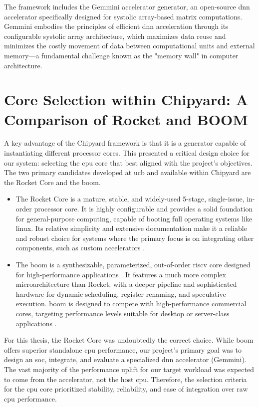 The framework includes the Gemmini accelerator generator, an open-source \acrshort{dnn} accelerator specifically designed for systolic array-based matrix computations. Gemmini embodies the principles of efficient \acrshort{dnn} acceleration through its configurable systolic array architecture, which maximizes data reuse and minimizes the costly movement of data between computational units and external memory—a fundamental challenge known as the "memory wall" in computer architecture.

\section{Core Selection within Chipyard: A Comparison of Rocket and BOOM}

A key advantage of the Chipyard framework is that it is a generator capable of instantiating different processor cores. This presented a critical design choice for our system: selecting the \acrshort{cpu} core that best aligned with the project's objectives. The two primary candidates developed at \acrshort{ucb} and available within Chipyard are the Rocket Core and the \acrfull{boom}.

\begin{itemize}
    \item The Rocket Core is a mature, stable, and widely-used 5-stage, single-issue, in-order processor core. It is highly configurable and provides a solid foundation for general-purpose computing, capable of booting full operating systems like \acrshort{linux}. Its relative simplicity and extensive documentation make it a reliable and robust choice for systems where the primary focus is on integrating other components, such as custom accelerators \cite{asanovic2016rocketchip}.
    \item The \acrfull{boom} is a synthesizable, parameterized, out-of-order \acrshort{riscv} core designed for high-performance applications \cite{celio2016boom_spec, celio_phdthesis_2018boom}. It features a much more complex microarchitecture than Rocket, with a deeper pipeline and sophisticated hardware for dynamic scheduling, register renaming, and speculative execution. \acrshort{boom} is designed to compete with high-performance commercial cores, targeting performance levels suitable for desktop or server-class applications \cite{zhao2020sonicboom_ieee}.
\end{itemize}

For this thesis, the Rocket Core was undoubtedly the correct choice. While \acrshort{boom} offers superior standalone \acrshort{cpu} performance, our project's primary goal was to design an \acrshort{soc}, integrate, and evaluate a specialized \acrshort{dnn} accelerator (Gemmini). The vast majority of the performance uplift for our target workload was expected to come from the accelerator, not the host \acrshort{cpu}. Therefore, the selection criteria for the \acrshort{cpu} core prioritized stability, reliability, and ease of integration over raw \acrshort{cpu} performance.

